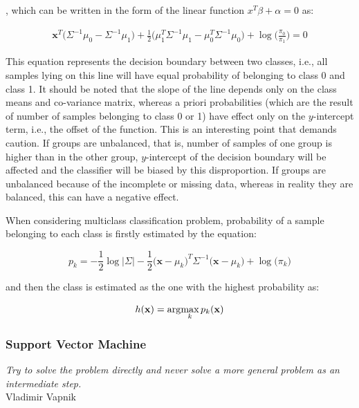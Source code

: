 , which can be written in the form of the linear function $x^T\beta + \alpha = 0$ as:

\begin{equation} 
\begin{split}
\mathbf{x}^T\Big(\Sigma^{-1} \mu_0 - \Sigma^{-1} \mu_1\Big) + \frac{1}{2} \Big(\mu_1^T \Sigma^{-1}\mu_1 - \mu_0^T \Sigma^{-1}\mu_0\Big)
+ \log\Big( \frac{\pi_0}{\pi_1}  \Big) = 0
\end{split}
\end{equation}

This equation represents the decision boundary between two classes, i.e., all samples lying on this line will have equal probability of belonging to class 0 and class 1. It should be noted that the slope of the line depends only on the class means and co-variance matrix, whereas a priori probabilities (which are the result of number of samples belonging to class 0 or 1) have effect only on the $y$-intercept term, i.e., the offset of the function. This is an interesting point that demands caution. If groups are unbalanced, that is, number of samples of one group is higher than in the other group, $y$-intercept of the decision boundary will be affected and the classifier will be biased by this disproportion. If groups are unbalanced because of the incomplete or missing data, whereas in reality they are balanced, this can have a negative effect.

When considering multiclass classification problem, probability of a sample belonging to each class is firstly estimated by the equation:

\begin{equation}
p_k = -\frac{1}{2} \log \big\vert \Sigma \big\vert - \frac{1}{2}  \Big(\mathbf{x}-\mu_k\Big)^T  \Sigma^{-1} \Big(\mathbf{x}-\mu_k\Big) +  \log{\Big(\pi_k\Big)}
\end{equation}

\noindent and then the class is estimated as the one with the highest probability as:

\begin{equation} 
h(\mathbf{x}) = \arg\!\max_k p_k(\mathbf{x})
\end{equation}


\subsubsection{Support Vector Machine}

\begin{myquote}
\begin{flushright}
\textit{Try to solve the problem directly and never solve a more general problem as an intermediate step.} \\Vladimir Vapnik
\end{flushright}
\end{myquote}



